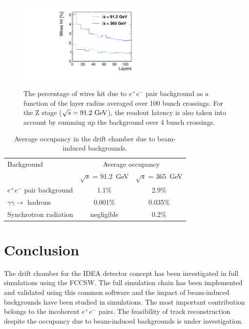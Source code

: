 \documentclass[conference]{IEEEtran}
\begin{document}
\begin{figure}[!h]
\centering
\includegraphics[width=2.5in]{Poster/Figures/incoherent_top_Z.pdf}
\caption{The percentage of wires hit due to $e^+e^-$ pair background as a function of the layer radius averaged over 100 bunch crossings. For the Z stage ($\sqrt{s} = 91.2\,\mathrm{\,Ge\kern -0.1em V}$), the readout latency is also taken into account by summing up the background over 4 bunch crossings.}
\label{fig_simhitspercent}
\end{figure}

\begin{table}[!h]
	\renewcommand{\arraystretch}{1.3}
	\caption{Average occupancy in the drift chamber due to beam-induced backgrounds.}
	\label{occupancy_DCH}
	\centering
	\begin{tabular}{l c c}
		\toprule
		 Background & \multicolumn{2}{c}{Average occupancy} \\
			& $\sqrt{s}$ = 91.2~GeV & $\sqrt{s}$ = 365~GeV \\
		 \midrule
		 $e^+e^-$ pair background & 1.1\% & 2.9\% \\
		 $\gamma\gamma\rightarrow$ hadrons & 0.001\% & 0.035\%  \\
		 Synchrotron radiation & negligible & 0.2\% \\
		 \bottomrule
	\end{tabular}
\end{table}

\section{Conclusion}
The drift chamber for the IDEA detector concept has been investigated in full simulations using the FCCSW. The full simulation chain has been implemented and validated using this common software and the impact of beam-induced backgrounds have been studied in simulations. The most important contribution belongs to the incoherent $e^+e^-$ pairs. The feasibility of track reconstruction despite the occupancy due to beam-induced backgrounds is under investigation.
\end{document}
